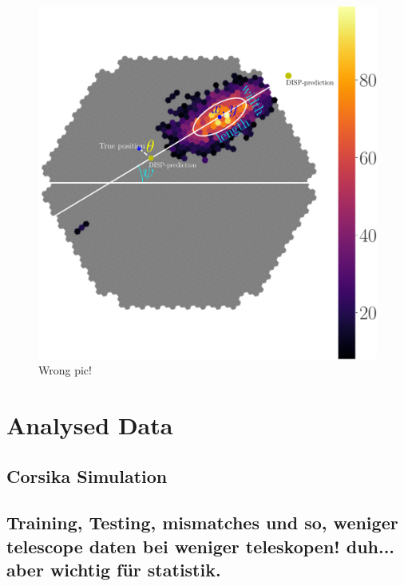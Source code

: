 \begin{figure}
    \includegraphics[width=0.9\linewidth]{Plots/hillas_complete.pdf}
    \caption{Wrong pic!}
    \label{fig:disp_amb}
\end{figure}


\section{Analysed Data}
\subsection{Corsika Simulation}
\subsection{Training, Testing, mismatches und so, weniger telescope daten bei weniger teleskopen! duh... aber wichtig für statistik.}
